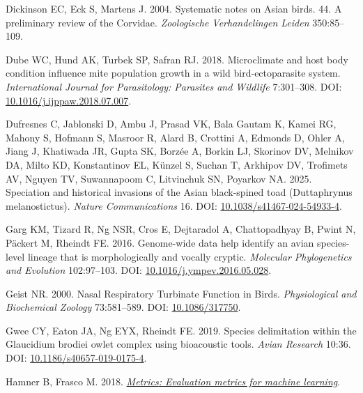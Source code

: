 \documentclass[10pt,a4paper]{article}
\newlength{\cslhangindent}
\newenvironment{CSLReferences}[2] %
 {\begin{list}{}{%
  \setlength{\itemindent}{0pt}
  \setlength{\leftmargin}{0pt}
  \setlength{\parsep}{0pt}
  \ifodd #1
   \setlength{\leftmargin}{\cslhangindent}
   \setlength{\itemindent}{-1\cslhangindent}
  \fi
  \setlength{\itemsep}{#2\baselineskip}}}
 {\end{list}}
\begin{document}
\begin{CSLReferences}{1}{0}
Dickinson EC, Eck S, Martens J. 2004. Systematic notes on {Asian} birds. 44. {A} preliminary review of the {Corvidae}. \emph{Zoologische Verhandelingen Leiden} 350:85--109.

Dube WC, Hund AK, Turbek SP, Safran RJ. 2018. Microclimate and host body condition influence mite population growth in a wild bird-ectoparasite system. \emph{International Journal for Parasitology: Parasites and Wildlife} 7:301--308. DOI: \href{https://doi.org/10.1016/j.ijppaw.2018.07.007}{10.1016/j.ijppaw.2018.07.007}.

Dufresnes C, Jablonski D, Ambu J, Prasad VK, Bala Gautam K, Kamei RG, Mahony S, Hofmann S, Masroor R, Alard B, Crottini A, Edmonds D, Ohler A, Jiang J, Khatiwada JR, Gupta SK, Borzée A, Borkin LJ, Skorinov DV, Melnikov DA, Milto KD, Konstantinov EL, Künzel S, Suchan T, Arkhipov DV, Trofimets AV, Nguyen TV, Suwannapoom C, Litvinchuk SN, Poyarkov NA. 2025. Speciation and historical invasions of the {Asian} black-spined toad ({Duttaphrynus} melanostictus). \emph{Nature Communications} 16. DOI: \href{https://doi.org/10.1038/s41467-024-54933-4}{10.1038/s41467-024-54933-4}.

Garg KM, Tizard R, Ng NSR, Cros E, Dejtaradol A, Chattopadhyay B, Pwint N, Päckert M, Rheindt FE. 2016. Genome-wide data help identify an avian species-level lineage that is morphologically and vocally cryptic. \emph{Molecular Phylogenetics and Evolution} 102:97--103. DOI: \href{https://doi.org/10.1016/j.ympev.2016.05.028}{10.1016/j.ympev.2016.05.028}.

Geist NR. 2000. Nasal {Respiratory} {Turbinate} {Function} in {Birds}. \emph{Physiological and Biochemical Zoology} 73:581--589. DOI: \href{https://doi.org/10.1086/317750}{10.1086/317750}.

Gwee CY, Eaton JA, Ng EYX, Rheindt FE. 2019. Species delimitation within the {Glaucidium} brodiei owlet complex using bioacoustic tools. \emph{Avian Research} 10:36. DOI: \href{https://doi.org/10.1186/s40657-019-0175-4}{10.1186/s40657-019-0175-4}.

Hamner B, Frasco M. 2018. \emph{\href{https://CRAN.R-project.org/package=Metrics}{{Metrics}: Evaluation metrics for machine learning}}.


\end{CSLReferences}
\end{document}
